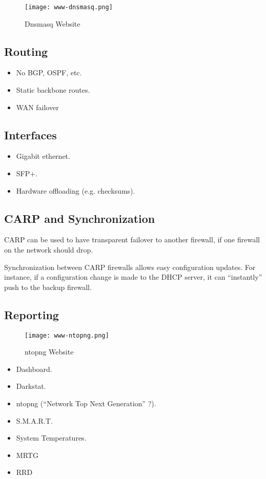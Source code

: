 \begin{figure}[h!]
\texttt{[image: www-dnsmasq.png]}
 \caption{Dnsmasq Website}
 \label{fig:www-dnsmasq}
\end{figure}



\subsection{Routing}
\begin{itemize}
 \item No BGP, OSPF, etc.
 \item Static backbone routes.
 \item WAN failover
\end{itemize}


\subsection{Interfaces}

\begin{itemize}
 \item Gigabit ethernet.
 \item SFP+.
 \item Hardware offloading (e.g. checksums).
\end{itemize}


\subsection{CARP and Synchronization}
CARP can be used to have transparent failover to another firewall, if one
firewall on the network should drop.

Synchronization between CARP firewalls allows easy configuration updates. For
instance, if a configuration change is made to the DHCP server, it can
``instantly'' push to the backup firewall.


\subsection{Reporting}

\begin{figure}[h!]
\texttt{[image: www-ntopng.png]}
 \caption{ntopng Website}
 \label{fig:www-ntopng}
\end{figure}

\begin{itemize}
 \item Dashboard.
 \item Darkstat.
 \item ntopng (``Network Top Next Generation'' ?).
 \item S.M.A.R.T.
 \item System Temperatures.
 \item MRTG
 \item RRD
\end{itemize}


